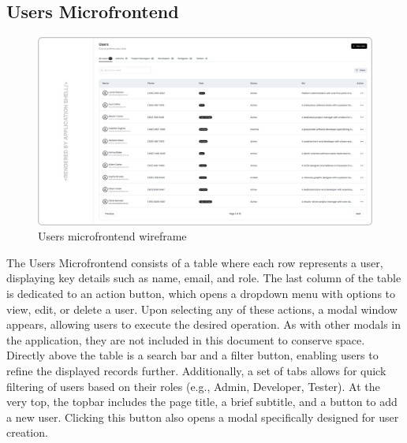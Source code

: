 \subsection{Users Microfrontend}
\begin{figure}[h]
\centerline{\includegraphics[width=1\textwidth]{images/wireframes/users.png}}
\caption[Users microfrontend wireframe]{Users microfrontend wireframe}
\label{mf:users}
\end{figure}
The Users Microfrontend consists of a table where each row represents a user, displaying key details such as name, email, and role. The last column of the table is dedicated to an action button, which opens a dropdown menu with options to view, edit, or delete a user. Upon selecting any of these actions, a modal window appears, allowing users to execute the desired operation. As with other modals in the application, they are not included in this document to conserve space. Directly above the table is a search bar and a filter button, enabling users to refine the displayed records further. Additionally, a set of tabs allows for quick filtering of users based on their roles (e.g., Admin, Developer, Tester). At the very top, the topbar includes the page title, a brief subtitle, and a button to add a new user. Clicking this button also opens a modal specifically designed for user creation.

